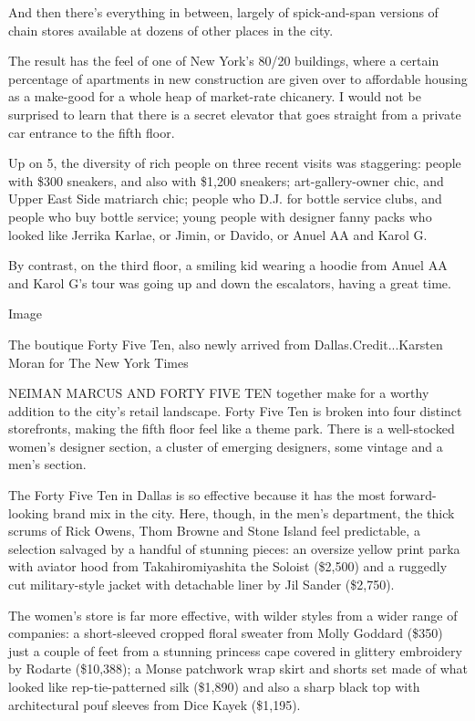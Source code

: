 And then there's everything in between, largely of spick-and-span
versions of chain stores available at dozens of other places in the
city.

The result has the feel of one of New York's 80/20 buildings, where a
certain percentage of apartments in new construction are given over to
affordable housing as a make-good for a whole heap of market-rate
chicanery. I would not be surprised to learn that there is a secret
elevator that goes straight from a private car entrance to the fifth
floor.

Up on 5, the diversity of rich people on three recent visits was
staggering: people with \$300 sneakers, and also with \$1,200 sneakers;
art-gallery-owner chic, and Upper East Side matriarch chic; people who
D.J. for bottle service clubs, and people who buy bottle service; young
people with designer fanny packs who looked like Jerrika Karlae, or
Jimin, or Davido, or Anuel AA and Karol G.

By contrast, on the third floor, a smiling kid wearing a hoodie from
Anuel AA and Karol G's tour was going up and down the escalators, having
a great time.

Image

The boutique Forty Five Ten, also newly arrived from
Dallas.Credit...Karsten Moran for The New York Times

NEIMAN MARCUS AND FORTY FIVE TEN together make for a worthy addition to
the city's retail landscape. Forty Five Ten is broken into four distinct
storefronts, making the fifth floor feel like a theme park. There is a
well-stocked women's designer section, a cluster of emerging designers,
some vintage and a men's section.

The Forty Five Ten in Dallas is so effective because it has the most
forward-looking brand mix in the city. Here, though, in the men's
department, the thick scrums of Rick Owens, Thom Browne and Stone Island
feel predictable, a selection salvaged by a handful of stunning pieces:
an oversize yellow print parka with aviator hood from Takahiromiyashita
the Soloist (\$2,500) and a ruggedly cut military-style jacket with
detachable liner by Jil Sander (\$2,750).

The women's store is far more effective, with wilder styles from a wider
range of companies: a short-sleeved cropped floral sweater from Molly
Goddard (\$350) just a couple of feet from a stunning princess cape
covered in glittery embroidery by Rodarte (\$10,388); a Monse patchwork
wrap skirt and shorts set made of what looked like rep-tie-patterned
silk (\$1,890) and also a sharp black top with architectural pouf
sleeves from Dice Kayek (\$1,195).

